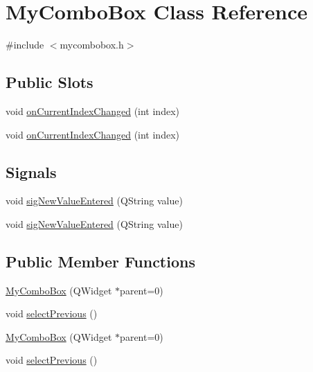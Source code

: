 \hypertarget{class_my_combo_box}{
\section{MyComboBox Class Reference}
\label{class_my_combo_box}
}


{\ttfamily \#include $<$mycombobox.h$>$}

\subsection*{Public Slots}
\begin{DoxyCompactItemize}
\item 
void \hyperlink{class_my_combo_box_aac492fd91ffa87c3aa9b15bf4da21f1b}{onCurrentIndexChanged} (int index)
\item 
void \hyperlink{class_my_combo_box_aac492fd91ffa87c3aa9b15bf4da21f1b}{onCurrentIndexChanged} (int index)
\end{DoxyCompactItemize}
\subsection*{Signals}
\begin{DoxyCompactItemize}
\item 
void \hyperlink{class_my_combo_box_a0e67164987eb6e0826aa7d06141d4a9e}{sigNewValueEntered} (QString value)
\item 
void \hyperlink{class_my_combo_box_a0e67164987eb6e0826aa7d06141d4a9e}{sigNewValueEntered} (QString value)
\end{DoxyCompactItemize}
\subsection*{Public Member Functions}
\begin{DoxyCompactItemize}
\item 
\hyperlink{class_my_combo_box_ac9753f9c8676f74ceb7c40b47cfd17e3}{MyComboBox} (QWidget $\ast$parent=0)
\item 
void \hyperlink{class_my_combo_box_a044374cbf5277d974b6734515c3049ba}{selectPrevious} ()
\item 
\hyperlink{class_my_combo_box_ac9753f9c8676f74ceb7c40b47cfd17e3}{MyComboBox} (QWidget $\ast$parent=0)
\item 
void \hyperlink{class_my_combo_box_a044374cbf5277d974b6734515c3049ba}{selectPrevious} ()
\end{DoxyCompactItemize}


